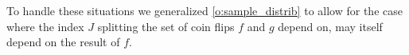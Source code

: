 To handle these situations we generalized \cref{o:sample_distrib} to allow for the case where the index $J$ splitting the set of coin flips $f$ and $g$ depend on, may itself depend on the result of $f$.
%

